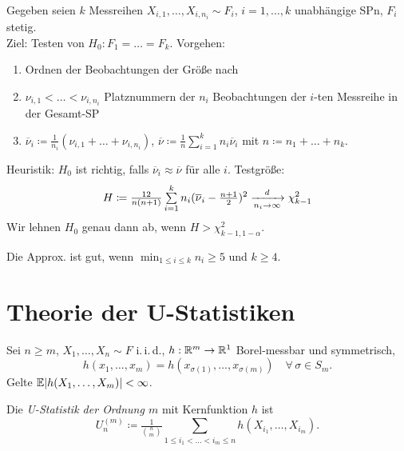 \documentclass{cheat-sheet}
\newcommand{\E}{\mathbb{E}} %
\newcommand{\iid}{i.\,i.\,d.} %
\newcommand{\testh}[1]{\textcolor{TestColor}{\textbf{#1}}}
\begin{document}
\begin{test}
  Gegeben seien $k$ Messreihen $X_{i,1}, \ldots, X_{i,n_i} \sim F_i$, $i = 1, \ldots, k$ unabhängige SPn, $F_i$ stetig. \\
  Ziel: Testen von \testh{$H_0 : F_1 = \ldots = F_k$}.
  Vorgehen:
  \begin{enumerate}
    \item Ordnen der Beobachtungen der Größe nach
    \item $\nu_{i,1} < \ldots < \nu_{i,n_i}$ Platznummern der $n_i$ Beobachtungen der $i$-ten Messreihe in der Gesamt-SP
    \item $\overline{\nu}_i \coloneqq \tfrac{1}{n_i} (\nu_{i,1} + \ldots + \nu_{i,n_i})$, $\overline{\nu} \coloneqq \tfrac{1}{n} \sum_{i=1}^k n_i \overline{\nu}_i$ mit $n \coloneqq n_1 + \ldots + n_k$.
  \end{enumerate}
  Heuristik: $H_0$ ist richtig, falls $\overline{\nu}_i \approx \overline{\nu}$ für alle $i$.
  Testgröße:
  \[
    H \coloneqq \tfrac{12}{n (n+1)} \sum_{i=1}^k n_i (\overline{\nu}_i - \tfrac{n+1}{2})^2
    \xra[n_i \to \infty]{d} \chi^2_{k-1}
  \]
  Wir lehnen $H_0$ genau dann ab, wenn $H > \chi^2_{k-1,1-\alpha}$.
\end{test}

\begin{faustregel}
  Die Approx. ist gut, wenn $\min_{1 \leq i \leq k} n_i \geq 5$ und $k \geq 4$.
\end{faustregel}

\section{Theorie der U-Statistiken}


\begin{situation}
  Sei $n \geq m$, $X_1, \ldots, X_n \sim F$ \iid{}, $h : \mathbb{R}^m \to \mathbb{R}^1$ Borel-messbar und symmetrisch, \dh{}
  \[
    h(x_1, \ldots, x_m) = h(x_{\sigma(1)}, \ldots, x_{\sigma(m)}) \quad
    \forall \, \sigma \in S_m.
  \]
  Gelte $\E \abs{h(X_1, \ldots, X_m)} < \infty$.
\end{situation}

\begin{defn}
  Die \emph{U-Statistik der Ordnung $m$} mit Kernfunktion $h$ ist
  \[ U_n^{(m)} \coloneqq \tfrac{1}{\binom{n}{m}} \sum_{1 \leq i_1 < \ldots < i_m \leq n} h(X_{i_1}, \ldots, X_{i_m}). \]
\end{defn}
\end{document}
